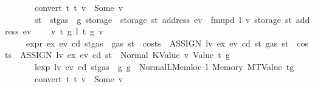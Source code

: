 \begin{isabellebody}
\ \ \ \ \ \ \ {\isachardoublequoteopen}convert\ t\ t{\isacharprime}{\kern0pt}\ v\ {\isacharequal}{\kern0pt}\ Some\ v{\isacharprime}{\kern0pt}{\isachardoublequoteclose}\isanewline
\ \ \ \ \ \ \ {\isachardoublequoteopen}st{\isacharprime}{\kern0pt}\ {\isacharequal}{\kern0pt}\ st{\isasymlparr}gas\ {\isacharcolon}{\kern0pt}{\isacharequal}{\kern0pt}\ g{\isacharprime}{\kern0pt}{\isacharcomma}{\kern0pt}\ storage\ {\isacharcolon}{\kern0pt}{\isacharequal}{\kern0pt}\ {\isacharparenleft}{\kern0pt}storage\ st{\isacharparenright}{\kern0pt}\ {\isacharparenleft}{\kern0pt}address\ ev\ {\isacharcolon}{\kern0pt}{\isacharequal}{\kern0pt}\ {\isacharparenleft}{\kern0pt}fmupd\ l\ v{\isacharprime}{\kern0pt}\ {\isacharparenleft}{\kern0pt}storage\ st\ {\isacharparenleft}{\kern0pt}address\ ev{\isacharparenright}{\kern0pt}{\isacharparenright}{\kern0pt}{\isacharparenright}{\kern0pt}{\isacharparenright}{\kern0pt}{\isasymrparr}{\isachardoublequoteclose}\isanewline
\ \ {\isacharbar}{\kern0pt}\ {\isacharparenleft}{\kern0pt}{}{\isacharparenright}{\kern0pt}\ v\ t\ g\ l\ t{\isacharprime}{\kern0pt}\ g{\isacharprime}{\kern0pt}\ v{\isacharprime}{\kern0pt}\isanewline
\ \ \ \ \ {\isachardoublequoteopen}expr\ ex\ ev\ cd\ {\isacharparenleft}{\kern0pt}st{\isasymlparr}gas\ {\isacharcolon}{\kern0pt}{\isacharequal}{\kern0pt}\ gas\ st\ {\isacharminus}{\kern0pt}\ costs\ \ {\isacharparenleft}{\kern0pt}ASSIGN\ lv\ ex{\isacharparenright}{\kern0pt}\ ev\ cd\ st{\isasymrparr}{\isacharparenright}{\kern0pt}\ {\isacharparenleft}{\kern0pt}gas\ st\ {\isacharminus}{\kern0pt}\ costs\ \ {\isacharparenleft}{\kern0pt}ASSIGN\ lv\ ex{\isacharparenright}{\kern0pt}\ ev\ cd\ st{\isacharparenright}{\kern0pt}\ {\isacharequal}{\kern0pt}\ Normal\ {\isacharparenleft}{\kern0pt}{\isacharparenleft}{\kern0pt}KValue\ v{\isacharcomma}{\kern0pt}\ Value\ t{\isacharparenright}{\kern0pt}{\isacharcomma}{\kern0pt}\ g{\isacharparenright}{\kern0pt}{\isachardoublequoteclose}\isanewline
\ \ \ \ \ \ \ {\isachardoublequoteopen}lexp\ lv\ ev\ cd\ {\isacharparenleft}{\kern0pt}st{\isasymlparr}gas\ {\isacharcolon}{\kern0pt}{\isacharequal}{\kern0pt}\ g{\isasymrparr}{\isacharparenright}{\kern0pt}\ g\ {\isacharequal}{\kern0pt}\ Normal{\isacharparenleft}{\kern0pt}{\isacharparenleft}{\kern0pt}LMemloc\ l{\isacharcomma}{\kern0pt}\ Memory\ {\isacharparenleft}{\kern0pt}MTValue\ t{\isacharprime}{\kern0pt}{\isacharparenright}{\kern0pt}{\isacharparenright}{\kern0pt}{\isacharcomma}{\kern0pt}g{\isacharprime}{\kern0pt}{\isacharparenright}{\kern0pt}{\isachardoublequoteclose}\isanewline
\ \ \ \ \ \ \ {\isachardoublequoteopen}convert\ t\ t{\isacharprime}{\kern0pt}\ v\ {\isacharequal}{\kern0pt}\ Some\ v{\isacharprime}{\kern0pt}{\isachardoublequoteclose}\isanewline

\end{isabellebody}
